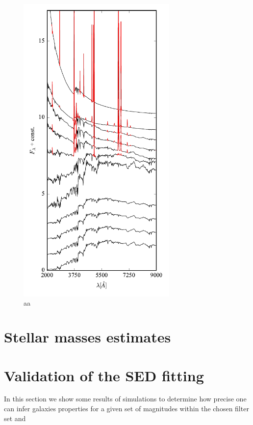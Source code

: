 \documentclass[9pt]{memoir}
\begin{document}
\begin{figure}
\begin{adjustwidth*}{1in}{0pt}
\centering
\includegraphics[width=0.7\textwidth]{figures/bpz_templates.pdf}
\end{adjustwidth*}
\caption{aa}
\label{fig:bpz_templates}
\end{figure}

\section{Stellar masses estimates}

\section{Validation of the SED fitting}

In this section we show some results of simulations to determine how precise one can infer galaxies properties for a given set of magnitudes within the chosen filter set and 
\end{document}
